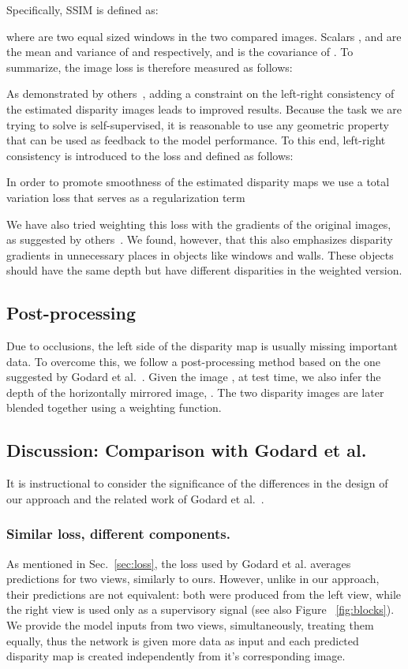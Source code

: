 \documentclass[10pt,twocolumn,letterpaper]{article}
\newcommand{\minisection}[1]{\vspace{1mm}\noindent{\textbf{#1}}}
\begin{document}
Specifically, SSIM is defined as:

where  are two equal sized windows in the two compared images. Scalars , and  are the mean and variance of  and  respectively, and  is the covariance of . To summarize, the image loss is therefore measured as follows:


\minisection{Left-right consistency loss.} As demonstrated by others~\cite{monodepth17}, adding a constraint on the left-right consistency of the estimated disparity images leads to improved results. Because the task we are trying to solve is self-supervised, it is reasonable to use any geometric property that can be used as feedback to the model performance. To this end, left-right consistency is introduced to the loss and defined as follows:


\minisection{Total variation loss.}
In order to promote smoothness of the estimated disparity maps we use a total variation loss that serves as a regularization term

We have also tried weighting this loss with the gradients of the original images, as suggested by others~\cite{monodepth17}. We found, however, that this also emphasizes disparity gradients in unnecessary places in objects like windows and walls. These objects should have the same depth but have different disparities in the weighted version.

\subsection{Post-processing} \label{post-processing}
Due to occlusions, the left side of the disparity map is usually missing important data. To overcome this, we follow a post-processing method based on the one suggested by Godard et al.~\cite{monodepth17}. Given the image , at test time, we also infer the depth of the horizontally mirrored image, . The two disparity images are later blended together using a weighting function.

\subsection{Discussion: Comparison with Godard et al.~\cite{monodepth17}} \label{mono-discussion}
It is instructional to consider the significance of the differences in the design of our approach and the related work of Godard et al.~\cite{monodepth17}.


\subsubsection{Similar loss, different components.}
As mentioned in Sec.~\ref{sec:loss}, the loss used by Godard et al. averages predictions for two views, similarly to ours. However, unlike in our approach, their predictions are not equivalent: both were produced from the left view, while the right view is used only as a supervisory signal (see also Figure ~\ref{fig:blocks}). We provide the model inputs from two views, simultaneously, treating them equally, thus the network is given more data as input and each predicted disparity map is created independently from it's corresponding image.
\end{document}
